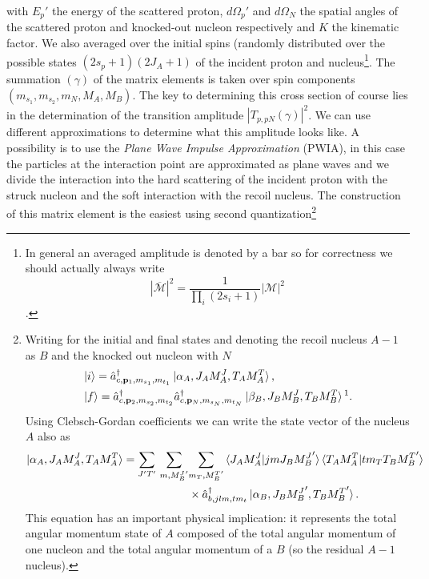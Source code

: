 \documentclass[11pt]{article}
\numberwithin{equation}{section}
\begin{document}
with $E_p'$ the energy of the scattered proton, $d\Omega_p'$ and $d\Omega_N$ the spatial angles of the scattered proton and knocked-out nucleon respectively and $K$ the kinematic factor. We also averaged over the initial spins (randomly distributed over the possible states $(2s_p + 1)(2J_A + 1)$ of the incident proton and nucleus\footnote{In general an averaged amplitude is denoted by a bar so for correctness we should actually always write
\begin{equation}
	|\overline{\mathcal{M}}|^2 = \frac{1}{\prod_i (2 s_i + 1)} |\mathcal{M}|^2
\end{equation}  .}. The summation $(\gamma)$ of the matrix elements is taken over spin components $(m_{s_1},m_{s_2},m_N, M_A,M_B)$. The key to determining this cross section of course lies in the determination of the transition amplitude  $|T_{p,pN}(\gamma)|^2$. We can use different approximations to determine what this amplitude looks like. A possibility is to use the \emph{Plane Wave Impulse Approximation} (PWIA), in this case the particles at the interaction point are approximated as plane waves and we divide the interaction into the hard scattering of the incident proton with the struck nucleon and the soft interaction with the recoil nucleus. The construction of this matrix element is the easiest using second quantization\footnote{ Writing for the initial and final states and denoting the recoil nucleus $A-1$ as $B$ and the knocked out nucleon with $N$
\begin{align}
\begin{split}
	&\ket{i} = \hat{a}^{\dagger}_{c,\mathbf{p}_1,m_{s_1},m_{t_1}}\ket{\alpha_A, J_AM_A^J, T_A M_A^T},\\
	&\ket{f} = \hat{a}^{\dagger}_{c,\mathbf{p}_2,m_{s_2},m_{t_2}}\hat{a}^{\dagger}_{c,\mathbf{p}_N,m_{s_N},m_{t_N}} \ket{\beta_B,J_BM_B^J, T_B M_B^T}\text{\footnotemark} .
\end{split}
\end{align}
\noindent
Using Clebsch-Gordan coefficients we can write the state vector of the nucleus $A$ also as
\begin{align}
\begin{split}
	\ket{\alpha_A, J_A M_A^J, T_A M_A^T} =  \underset{J'T'}\sum ~\underset{m, {M^J_B}'}\sum & \underset{m_T, {M^T_B}'}\sum \braket{J_A M_A^J | jmJ_B {M_B^J}'}\braket{T_A M_A^T | tm_TT_B {M_B^T}'}\\
	& \times \hat{a}^{\dagger}_{b,jlm,tm_t}\ket{\alpha_B, J_B{M_B^J}', T_B {M_B^T}'}.
\end{split}
\end{align}
This equation has an important physical implication: it represents the total angular momentum state of $A$ composed of the total angular momentum of one nucleon and the total angular momentum of a $B$ (so the residual $A-1$ nucleus). }
\end{document}

